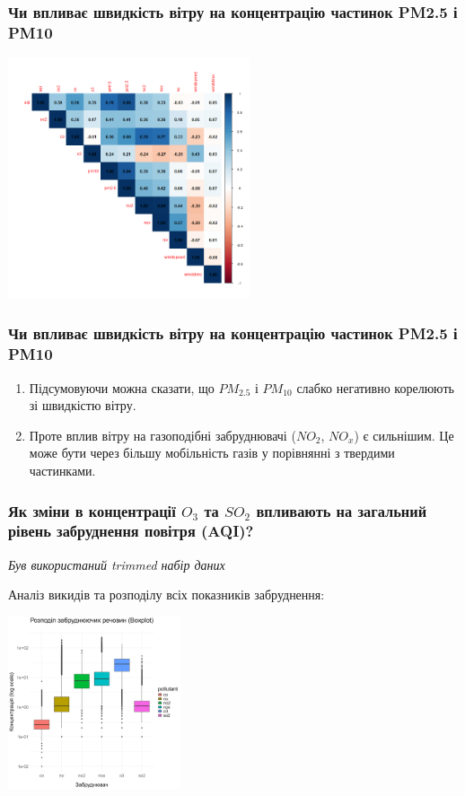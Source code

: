 \documentclass{beamer}
\begin{document}
\begin{frame}
  \frametitle{Чи впливає швидкість вітру на концентрацію частинок PM2.5 і PM10}

  \begin{center}
    \includegraphics[height=2.8in]{plots/question1/corr_matrix_plot.png}
  \end{center}
\end{frame}

\begin{frame}
  \frametitle{Чи впливає швидкість вітру на концентрацію частинок PM2.5 і PM10}

  \begin{enumerate}
    \item Підсумовуючи можна сказати, що $PM_{2.5}$ і $ PM_{10}$ слабко негативно корелюють зі швидкістю вітру.
    \item Проте вплив вітру на газоподібні забруднювачі ($NO_2$, $NO_x$) є сильнішим. 
    Це може бути через більшу мобільність газів у порівнянні з твердими частинками.
  \end{enumerate}

\end{frame}


\begin{frame}
  \frametitle{Як зміни в концентрації $O_3$ та $SO_2$ впливають на загальний рівень забруднення повітря (AQI)?}

  \textit{Був використаний trimmed набір даних}

  Аналіз викидів та розподілу всіх показників забруднення:

  \begin{center}
    \includegraphics[height=2in]{plots/question2/boxplot_pollutants.png}
  \end{center}
\end{frame}
\end{document}
